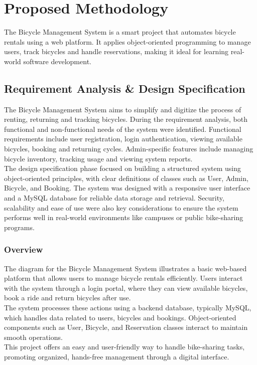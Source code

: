 \chapter{Proposed Methodology}
The Bicycle Management System is a smart project that automates bicycle rentals using a web platform. It applies object-oriented programming to manage users, track bicycles and handle reservations, making it ideal for learning real-world software development.



\section{Requirement Analysis \& Design Specification} The Bicycle Management System aims to simplify and digitize the process of renting, returning and tracking bicycles. During the requirement analysis, both functional and non-functional needs of the system were identified. Functional requirements include user registration, login authentication, viewing available bicycles, booking and returning cycles. Admin-specific features include managing bicycle inventory, tracking usage and viewing system reports.\\
The design specification phase focused on building a structured system using object-oriented principles, with clear definitions of classes such as User, Admin, Bicycle, and Booking. The system was designed with a responsive user interface and a MySQL database for reliable data storage and retrieval. Security, scalability and ease of use were also key considerations to ensure the system performs well in real-world environments like campuses or public bike-sharing programs.
\cite{2.1.1}

\subsection{Overview}
The diagram for the Bicycle Management System illustrates a basic web-based platform that allows users to manage bicycle rentals efficiently. Users interact with the system through a login portal, where they can view available bicycles, book a ride and return bicycles after use.\\
The system processes these actions using a backend database, typically MySQL, which handles data related to users, bicycles and bookings. Object-oriented components such as User, Bicycle, and Reservation classes interact to maintain smooth operations.\\
This project offers an easy and user-friendly way to handle bike-sharing tasks, promoting organized, hands-free management through a digital interface.\cite{2.1.3}


